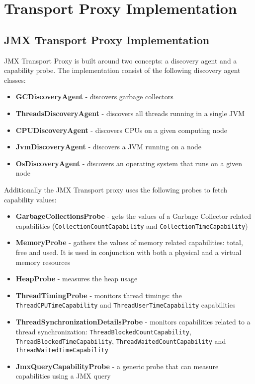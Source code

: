 \section{Transport Proxy Implementation}

\subsection{JMX Transport Proxy Implementation}

JMX Transport Proxy is built around two concepts: a discovery agent and a capability probe. The implementation consist of the following discovery agent classes:

\begin{itemize} 
  \item{\bf{GCDiscoveryAgent}} - discovers garbage collectors 
  \item{\bf{ThreadsDiscoveryAgent}} - discovers all threads running in a single JVM
  \item{\bf{CPUDiscoveryAgent}} - discovers CPUs on a given computing node
  \item{\bf{JvmDiscoveryAgent}} - discovers a JVM running on a node
  \item{\bf{OsDiscoveryAgent}} - discovers an operating system that runs on a given node
\end{itemize} 

Additionally the JMX Transport proxy uses the following probes to fetch capability values: 

\begin{itemize} 
  \item{\bf{GarbageCollectionsProbe}} - gets the values of a Garbage Collector related capabilities (\texttt{CollectionCountCapability} and \texttt{CollectionTimeCapability})
  \item{\bf{MemoryProbe}} - gathers the values of memory related capabilities: total, free and used. It is used in conjunction with both a physical and a virtual memory resources
  \item{\bf{HeapProbe}} - measures the heap usage  
  \item{\bf{ThreadTimingProbe}} - monitors thread timings: the \texttt{ThreadCPUTimeCapability} and \texttt{ThreadUserTimeCapability} capabilities
  \item{\bf{ThreadSynchronizationDetailsProbe}} - monitors capabilities related to a thread synchronization: \texttt{ThreadBlockedCountCapability}, \texttt{ThreadBlockedTimeCapability}, \texttt{ThreadWaitedCountCapability} and \texttt{ThreadWaitedTimeCapability}
  \item{\bf{JmxQueryCapabilityProbe}} - a generic probe that can measure capabilities using a JMX query
\end{itemize} 

